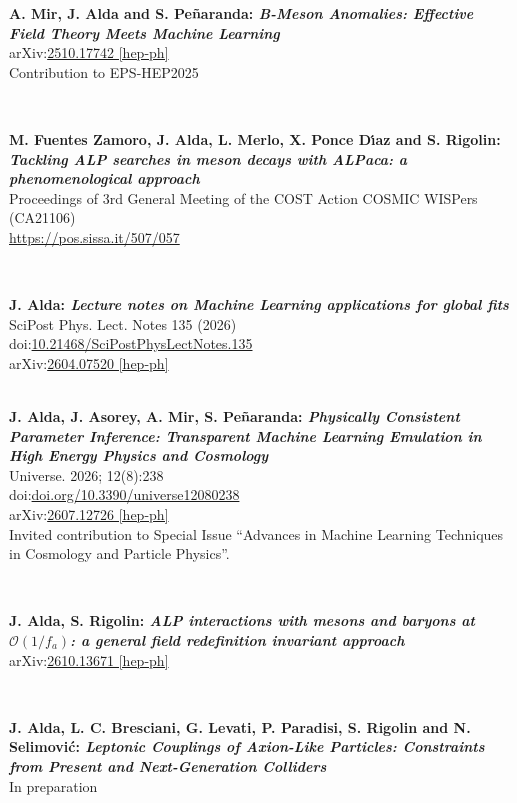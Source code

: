 \documentclass{cvf}
\begin{document}
\textbf{A. Mir, J. Alda and S. Peñaranda: \textit{B-Meson Anomalies: Effective Field Theory Meets Machine Learning}}\\
arXiv:\href{https://arxiv.org/abs/2510.17742}{2510.17742 [hep-ph]}\\
Contribution to EPS-HEP2025

~

\textbf{M. Fuentes Zamoro, J. Alda, L. Merlo, X. Ponce D{\'\i}az and S. Rigolin: \textit{Tackling ALP searches in meson decays with ALPaca: a phenomenological approach}}\\
Proceedings of 3rd General Meeting of the COST Action COSMIC WISPers (CA21106)\\
\url{https://pos.sissa.it/507/057}

~

\textbf{J. Alda: \textit{Lecture notes on Machine Learning applications for global fits}}\\
SciPost Phys. Lect. Notes 135 (2026)\\
doi:\href{https://doi.org/10.21468/SciPostPhysLectNotes.135}{10.21468/SciPostPhysLectNotes.135}\\
arXiv:\href{https://arxiv.org/abs/2604.07520}{2604.07520 [hep-ph]}\\

~

\textbf{J. Alda, J. Asorey, A. Mir, S. Peñaranda: \textit{Physically Consistent Parameter Inference: Transparent Machine Learning Emulation in High Energy Physics and Cosmology}}\\
Universe. 2026; 12(8):238\\
doi:\href{https://doi.org/10.3390/universe12080238 }{doi.org/10.3390/universe12080238 }\\
arXiv:\href{https://arxiv.org/abs/2607.12726}{2607.12726 [hep-ph]}\\
Invited contribution to Special Issue ``Advances in Machine Learning Techniques in Cosmology and Particle Physics''.

~

\textbf{J. Alda, S. Rigolin: \textit{ALP interactions with mesons and baryons at $\mathcal{O}(1/f_a)$: a general field redefinition invariant approach}}\\
arXiv:\href{https://arxiv.org/abs/2610.13671}{2610.13671 [hep-ph]}

~

\textbf{J. Alda, L. C. Bresciani, G. Levati, P. Paradisi, S. Rigolin and N. Selimovi\'c: \textit{Leptonic Couplings of Axion-Like Particles: Constraints from Present and Next-Generation Colliders}}\\
In preparation
\end{document}
